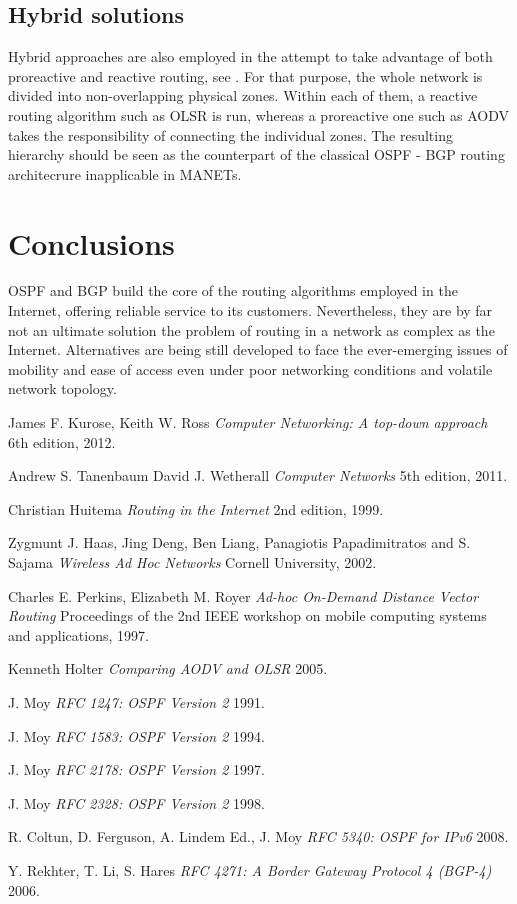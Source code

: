 \documentclass{acm_proc_article-sp}
\begin{document}
\subsection{Hybrid solutions}
Hybrid approaches are also employed in the attempt to take advantage of both proreactive and reactive routing, see \cite{haas}. For that purpose, the whole network is divided into non-overlapping physical zones. Within each of them, a reactive routing algorithm such as OLSR is run, whereas a proreactive one such as AODV takes the responsibility of connecting the individual zones. The resulting hierarchy should be seen as the counterpart of the classical OSPF - BGP routing architecrure inapplicable in MANETs.

\section{Conclusions}

OSPF and BGP build the core of the routing algorithms employed in the Internet, offering reliable service to its customers. Nevertheless, they are by far not an ultimate solution the problem of routing in a network as complex as the Internet. Alternatives are being still developed to face the ever-emerging issues of mobility and ease of access even under poor networking conditions and volatile network topology.

\begin{thebibliography}{1}

   James F. Kurose, Keith W. Ross {\em Computer Networking: A top-down approach}  6th edition, 2012.

    Andrew S. Tanenbaum David J. Wetherall {\em Computer Networks} 5th edition, 2011.

    Christian Huitema {\em Routing in the Internet} 2nd edition, 1999.
  
   Zygmunt J. Haas, Jing Deng, Ben Liang, Panagiotis Papadimitratos and S. Sajama {\em Wireless Ad Hoc Networks } Cornell University, 2002.

    Charles E. Perkins, Elizabeth M. Royer {\em Ad-hoc On-Demand Distance Vector Routing} Proceedings of the 2nd IEEE workshop on mobile computing systems and applications, 1997.
  
   Kenneth Holter {\em Comparing AODV and OLSR} 2005. 

   J. Moy {\em RFC 1247: OSPF Version 2} 1991.
  
   J. Moy {\em RFC 1583: OSPF Version 2} 1994.
  
   J. Moy {\em RFC 2178: OSPF Version 2} 1997.
  
   J. Moy {\em RFC 2328: OSPF Version 2} 1998.
  
   R. Coltun, D. Ferguson, A. Lindem Ed., J. Moy {\em RFC 5340: OSPF for IPv6} 2008.
  
   Y. Rekhter, T. Li, S. Hares {\em RFC 4271: A Border Gateway Protocol 4 (BGP-4)} 2006.
  
  \end{thebibliography}
\end{document}
